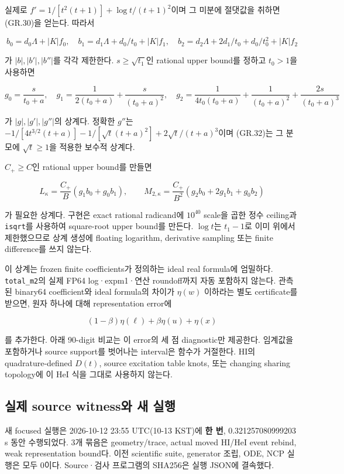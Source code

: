 \documentclass[11pt,a4paper]{article}
\begin{document}
실제로 \(f'=1/[t^2(t+1)]+\log t/(t+1)^2\)이며 그 미분에 절댓값을 취하면 (GR.30)을 얻는다. 따라서

\[
 b_0=d_0\Lambda+|K|f_0,\quad
 b_1=d_1\Lambda+d_0/t_0+|K|f_1,\quad
 b_2=d_2\Lambda+2d_1/t_0+d_0/t_0^2+|K|f_2
\tag{GR.31}
\]

가 \(|b|,|b'|,|b''|\)를 각각 제한한다. \(s\ge\sqrt{t_1}\)인 rational upper bound를 정하고 \(t_0>1\)을 사용하면

\[
 g_0=\frac{s}{t_0+a},\quad
 g_1=\frac1{2(t_0+a)}+\frac{s}{(t_0+a)^2},\quad
 g_2=\frac1{4t_0(t_0+a)}+\frac1{(t_0+a)^2}
        +\frac{2s}{(t_0+a)^3}
\tag{GR.32}
\]

가 \(|g|,|g'|,|g''|\)의 상계다. 정확한 \(g''\)는 \(-1/[4t^{3/2}(t+a)]-1/[\sqrt t(t+a)^2]+2\sqrt t/(t+a)^3\)이며 (GR.32)는 그 분모에 \(\sqrt t\ge1\)을 적용한 보수적 상계다.

\(C_+\ge C\)인 rational upper bound를 만들면

\[
 L_\kappa=\frac{C_+}{B}(g_1b_0+g_0b_1),\qquad
 M_{2,\kappa}=\frac{C_+}{B^2}(g_2b_0+2g_1b_1+g_0b_2)
\tag{GR.33}
\]

가 필요한 상계다. 구현은 exact rational radicand에 \(10^{40}\) scale을 곱한 정수 ceiling과 \texttt{isqrt}를 사용하여 square-root upper bound를 만든다. \(\log t\)는 \(t_1-1\)로 이미 위에서 제한했으므로 상계 생성에 floating logarithm, derivative sampling 또는 finite difference를 쓰지 않는다.

이 상계는 frozen finite coefficients가 정의하는 ideal real formula에 엄밀하다. \texttt{total\_m2}의 실제 FP64 log·expm1·연산 roundoff까지 자동 포함하지 않는다. 관측된 binary64 coefficient와 ideal formula의 차이가 \(\eta(w)\) 이하라는 별도 certificate를 받으면, 원자 하나에 대해 representation error에

\[
 (1-\beta)\eta(\ell)+\beta\eta(u)+\eta(x)
\tag{GR.34}
\]

를 추가한다. 아래 90-digit 비교는 이 error의 세 점 diagnostic만 제공한다. 임계값을 포함하거나 source support를 벗어나는 interval은 함수가 거절한다. HI의 quadrature-defined \(D(t)\), source excitation table knots, 또는 changing sharing topology에 이 HeI 식을 그대로 사용하지 않는다.

\hypertarget{uxc2e4uxc81c-source-witnessuxc640-uxc0c8-uxc2e4uxd589}{%
\subsection{실제 source witness와 새 실행}\label{uxc2e4uxc81c-source-witnessuxc640-uxc0c8-uxc2e4uxd589}}

새 focused 실행은 2026-10-12 23:55 UTC(10-13 KST)에 \textbf{한 번}, 0.321257080999203 s 동안 수행되었다. 3개 묶음은 geometry/trace, actual moved HI/HeI event rebind, weak representation bound다. 이전 scientific suite, generator 조립, ODE, NCP 실행은 모두 0이다. Source·검사 프로그램의 SHA256은 실행 JSON에 결속했다.
\end{document}
